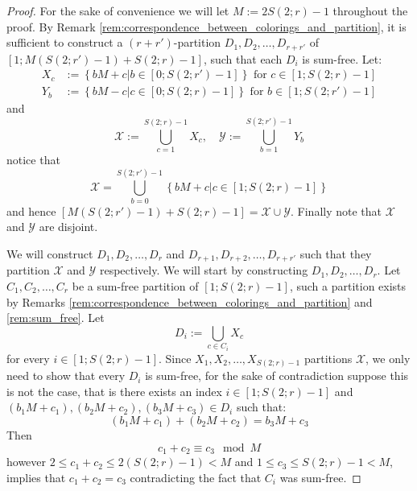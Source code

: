 \begin{proof}
	For the sake of convenience we will let $M := 2S(2; r) - 1$ throughout the proof. By Remark \ref{rem:correspondence_between_colorings_and_partition}, it is sufficient to construct a $(r + r')$-partition $D_1, D_2, \ldots, D_{r + r'}$ of $[1; M(S(2; r') - 1) + S(2; r) - 1]$, such that each $D_i$ is sum-free. Let:
	\begin{align*}
		X_c   & := \left\{bM + c | b \in [0; S(2; r') - 1]\right\} \text{ for } c \in [1; S(2; r) - 1] \\
		Y_{b} & := \left\{bM - c | c \in [0; S(2; r) - 1]\right\} \text{ for } b \in [1; S(2; r') - 1]
	\end{align*}
	and
	\begin{equation*}
		\mathcal{X} := \bigcup_{c = 1}^{S(2; r) - 1} X_c, \quad \mathcal{Y} := \bigcup_{b = 1}^{S(2; r') - 1} Y_{b}
	\end{equation*}
	notice that
	\begin{equation*}
		\mathcal{X} = \bigcup_{b = 0}^{S(2; r') - 1} \left\{bM + c | c \in [1; S(2; r) - 1]\right\}
	\end{equation*}
	and hence $[M(S(2; r') - 1) + S(2; r) - 1] = \mathcal{X} \cup \mathcal{Y}$. Finally note that $\mathcal{X}$ and $\mathcal{Y}$ are disjoint.

	We will construct $D_1, D_2, \ldots, D_r$ and $D_{r + 1}, D_{r + 2}, \ldots, D_{r + r'}$ such that they partition $\mathcal{X}$ and $\mathcal{Y}$ respectively. %
	We will start by constructing $D_1, D_2, \ldots, D_r$. Let $C_1, C_2, \ldots, C_r$ be a sum-free partition of $[1; S(2; r) - 1]$, such a partition exists by Remarks \ref{rem:correspondence_between_colorings_and_partition} and \ref{rem:sum_free}. Let
	\begin{equation*}
		D_i := \bigcup_{c \in C_i} X_c
	\end{equation*}
	for every $i \in [1; S(2; r) - 1]$. Since $X_1, X_2, \ldots, X_{S(2; r) - 1}$ partitions $\mathcal{X}$, we only need to show that every $D_i$ is sum-free, for the sake of contradiction suppose this is not the case, that is there exists an index $i \in [1; S(2; r) - 1]$ and $(b_1M + c_1), (b_2M + c_2), (b_3M + c_3) \in D_{i}$ such that:
	\begin{equation*}
		(b_1 M + c_1) + (b_2M + c_2) = b_3M + c_3
	\end{equation*}
	Then
	\begin{equation*}
		c_1 + c_2 \equiv c_3 \mod M
	\end{equation*}
	however $2 \leq c_1 + c_2 \leq 2(S(2; r) - 1) < M$ and $1 \leq c_3 \leq S(2; r) - 1 < M$, implies that $c_1 + c_2 = c_3$ contradicting the fact that $C_i$ was sum-free.


\end{proof}
